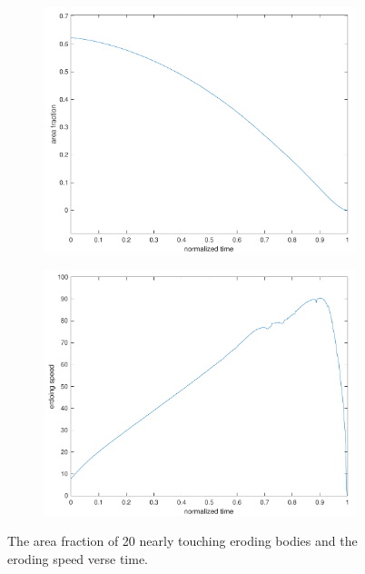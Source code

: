 \documentclass[preprint, 10pt]{elsarticle}
\begin{document}
\begin{figure}[H]
\begin{subfigure}[b]{0.5\textwidth}
\includegraphics*[width =\linewidth]{./figs/porosity20dense}
\caption{}
\end{subfigure}%
\begin{subfigure}[b]{0.5\textwidth}
\includegraphics*[width =\linewidth]{./figs/erodingspeed20dense}
\caption{}
\end{subfigure}
\caption{\label{fig:Eroding20area}  The area fraction of 20 nearly touching eroding bodies and the eroding speed verse time.}
\end{figure}
\end{document}
